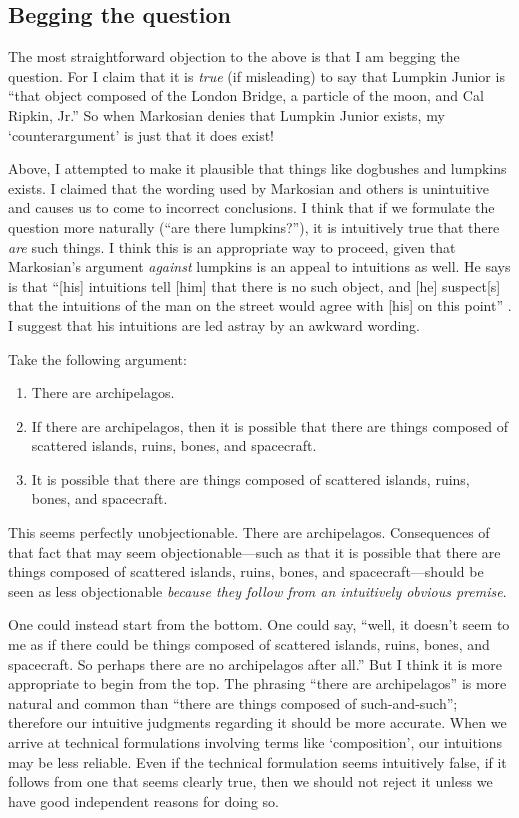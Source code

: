 \documentclass[11pt]{article}
\begin{document}
\begin{spacing}{1.25}
\subsection{Begging the question}
\label{beg}
The most straightforward objection to the above is that I am begging
the question.  For I claim that it is {\em true} (if misleading) to
say that Lumpkin Junior is ``that object composed of the London
Bridge, a particle of the moon, and Cal Ripkin, Jr.''  So when
Markosian denies that Lumpkin Junior exists, my `counterargument' is
just that it does exist!

Above, I attempted to make it plausible that things like dogbushes and
lumpkins exists.  I claimed that the wording used by Markosian and
others is unintuitive and causes us to come to incorrect conclusions.
I think that if we formulate the question more naturally (``are there
lumpkins?''), it is intuitively true that there {\em are} such things.
I think this is an appropriate way to proceed, given that Markosian's
argument {\em against} lumpkins is an appeal to intuitions as well.
He says is that ``[his] intuitions tell [him] that there is no such
object, and [he] suspect[s] that the intuitions of the man on the
street would agree with [his] on this point''
\citeyearpar[228]{markosian1998a}.  I suggest that his intuitions are
led astray by an awkward wording.

Take the following argument:

\begin{enumerate}
  \item There are archipelagos.
  \item If there are archipelagos, then it is possible that there are
    things composed of scattered islands, ruins, bones, and
    spacecraft.
  \item It is possible that there are things composed of scattered
    islands, ruins, bones, and spacecraft.
\end{enumerate}

This seems perfectly unobjectionable.  There are archipelagos.
Consequences of that fact that may seem objectionable---such as that
it is possible that there are things composed of scattered islands,
ruins, bones, and spacecraft---should be seen as less objectionable
{\em because they follow from an intuitively obvious premise}.

One could instead start from the bottom.  One could say, ``well, it
doesn't seem to me as if there could be things composed of scattered
islands, ruins, bones, and spacecraft.  So perhaps there are no
archipelagos after all.''  But I think it is more appropriate to begin
from the top.  The phrasing ``there are archipelagos'' is more natural
and common than ``there are things composed of such-and-such'';
therefore our intuitive judgments regarding it should be more
accurate.  When we arrive at technical formulations involving terms
like `composition', our intuitions may be less reliable.  Even if the
technical formulation seems intuitively false, if it follows from one
that seems clearly true, then we should not reject it unless we have
good independent reasons for doing so.


\end{spacing}
\end{document}
